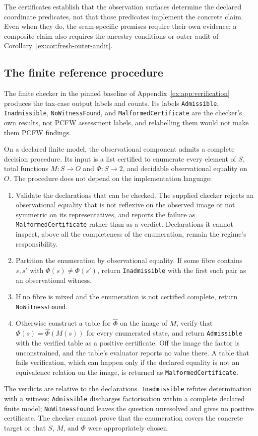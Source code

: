 \documentclass[twocolumn,envcountsect,envcountsame,natbib]{svjour3}
\newcommand{\code}[1]{\texttt{#1}}
\begin{document}
The certificates establish that the observation surfaces determine the declared coordinate predicates, not that those predicates implement the concrete claim. Even when they do, the seam-specific premises require their own evidence; a composite claim also requires the ancestry conditions or outer audit of Corollary~\ref{ex:cor:fresh-outer-audit}.

\subsection{The finite reference procedure}\label{ex:sec:finite-procedure}

The finite checker in the pinned baseline of Appendix~\ref{ex:app:verification} produces the tax-case output labels and counts. Its labels \code{Admissible}, \code{Inadmissible}, \code{NoWitnessFound}, and \code{MalformedCertificate} are the checker's own results, not PCFW assessment labels, and relabelling them would not make them PCFW findings.

On a declared finite model, the observational component admits a complete decision procedure. Its input is a list certified to enumerate every element of $S$, total functions $M:S\to O$ and $\Phi:S\to 2$, and decidable observational equality on $O$. The procedure does not depend on the implementation language:
\begin{enumerate}
\item Validate the declarations that can be checked. The supplied checker rejects an observational equality that is not reflexive on the observed image or not symmetric on its representatives, and reports the failure as \code{MalformedCertificate} rather than as a verdict. Declarations it cannot inspect, above all the completeness of the enumeration, remain the regime's responsibility.
\item Partition the enumeration by observational equality. If some fibre contains $s,s'$ with $\Phi(s)\neq\Phi(s')$, return \code{Inadmissible} with the first such pair as an observational witness.
\item If no fibre is mixed and the enumeration is not certified complete, return \code{NoWitnessFound}.
\item Otherwise construct a table for $\widehat\Phi$ on the image of $M$, verify that $\Phi(s)=\widehat\Phi(M(s))$ for every enumerated state, and return \code{Admissible} with the verified table as a positive certificate. Off the image the factor is unconstrained, and the table's evaluator reports no value there. A table that fails verification, which can happen only if the declared equality is not an equivalence relation on the image, is returned as \code{MalformedCertificate}.
\end{enumerate}
The verdicts are relative to the declarations. \code{Inadmissible} refutes determination with a witness; \code{Admissible} discharges factorisation within a complete declared finite model; \code{NoWitnessFound} leaves the question unresolved and gives no positive certificate. The checker cannot prove that the enumeration covers the concrete target or that $S$, $M$, and $\Phi$ were appropriately chosen.
\end{document}

